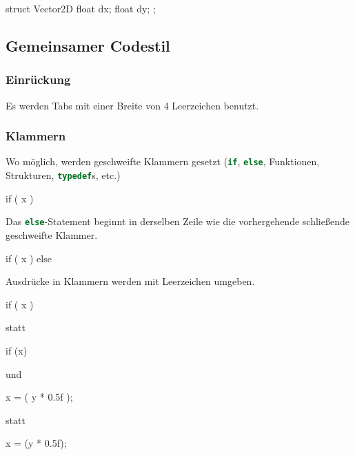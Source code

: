\documentclass{homework-pp}
\renewcommand{\c}[1]{\lstinline[language=c,basicstyle=\ttfamily]|#1|}
\begin{document}
\begin{cblock}
struct Vector2D {
	float dx;
	float dy;
};
\end{cblock}

\subsection{Gemeinsamer Codestil}

\subsubsection{Einrückung}

Es werden Tabs mit einer Breite von 4 Leerzeichen benutzt.

\subsubsection{Klammern}

Wo möglich, werden geschweifte Klammern gesetzt (\c{if}, \c{else}, Funktionen, Strukturen, \c{typedef}s, etc.)

\begin{cblock}
if ( x ) {

}
\end{cblock}

Das \c{else}-Statement beginnt in derselben Zeile wie die vorhergehende schließende geschweifte Klammer.

\begin{cblock}
if ( x ) {
} else {
}
\end{cblock}

Ausdrücke in Klammern werden mit Leerzeichen umgeben.

\begin{cblock}
if ( x ) {

}
\end{cblock}

statt

\begin{cblock}
if (x) {

}
\end{cblock}

und

\begin{cblock}
x = ( y * 0.5f );
\end{cblock}

statt

\begin{cblock}
x = (y * 0.5f);
\end{cblock}
\end{document}
